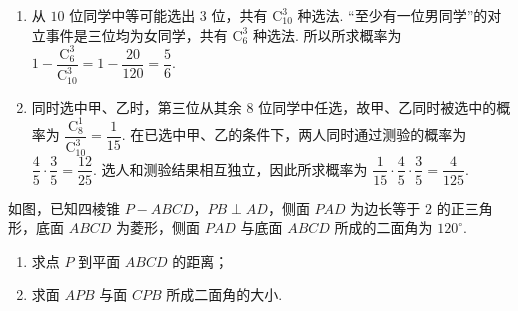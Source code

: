 \begin{solution}
\begin{enumerate}
\item 从 \(10\) 位同学中等可能选出 \(3\) 位，共有 \(\mathrm C_{10}^{3}\) 种选法. “至少有一位男同学”的对立事件是三位均为女同学，共有 \(\mathrm C_6^3\) 种选法. 所以所求概率为 \(1-\dfrac{\mathrm C_6^3}{\mathrm C_{10}^{3}}=1-\dfrac{20}{120}=\dfrac56\).
\item 同时选中甲、乙时，第三位从其余 \(8\) 位同学中任选，故甲、乙同时被选中的概率为 \(\dfrac{\mathrm C_8^1}{\mathrm C_{10}^{3}}=\dfrac1{15}\). 在已选中甲、乙的条件下，两人同时通过测验的概率为 \(\dfrac45\cdot\dfrac35=\dfrac{12}{25}\). 选人和测验结果相互独立，因此所求概率为 \(\dfrac1{15}\cdot\dfrac45\cdot\dfrac35=\dfrac4{125}\).
\end{enumerate}
\end{solution}

\begin{problem}
如图，已知四棱锥 \(P-ABCD\)，\(PB\perp AD\)，侧面 \(PAD\) 为边长等于 \(2\) 的正三角形，底面 \(ABCD\) 为菱形，侧面 \(PAD\) 与底面 \(ABCD\) 所成的二面角为 \(120^{\circ}\).

\begin{enumerate}
\item 求点 \(P\) 到平面 \(ABCD\) 的距离；
\item 求面 \(APB\) 与面 \(CPB\) 所成二面角的大小.
\end{enumerate}

\begin{center}
\end{center}
\end{problem}


